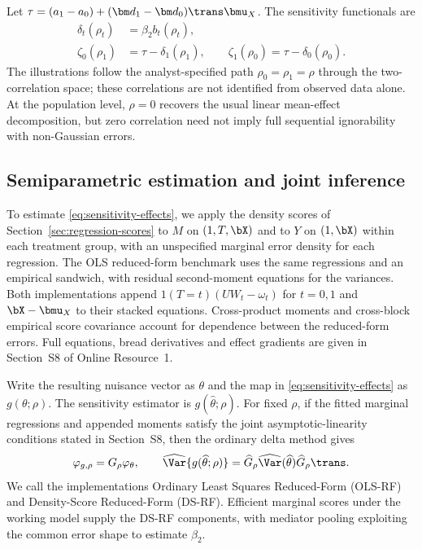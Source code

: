 Let $\tau=(a_1-a_0)+(\bm d_1-\bm d_0)\trans\bmu_X$. The sensitivity functionals are
\begin{align}
\delta_t(\rho_t)&=\beta_2 b_t(\rho_t),\nonumber\\
\zeta_0(\rho_1)&=\tau-\delta_1(\rho_1),\qquad
\zeta_1(\rho_0)=\tau-\delta_0(\rho_0).
\label{eq:sensitivity-effects}
\end{align}
The illustrations follow the analyst-specified path $\rho_0=\rho_1=\rho$ through the two-correlation space; these correlations are not identified from observed data alone. At the population level, $\rho=0$ recovers the usual linear mean-effect decomposition, but zero correlation need not imply full sequential ignorability with non-Gaussian errors.

\subsection{Semiparametric estimation and joint inference}

To estimate \eqref{eq:sensitivity-effects}, we apply the density scores of Section~\ref{sec:regression-scores} to $M$ on $(1,T,\bX)$ and to $Y$ on $(1,\bX)$ within each treatment group, with an unspecified marginal error density for each regression. The OLS reduced-form benchmark uses the same regressions and an empirical sandwich, with residual second-moment equations for the variances. Both implementations append $1(T=t)(UW_t-\omega_t)$ for $t=0,1$ and $\bX-\bmu_X$ to their stacked equations. Cross-product moments and cross-block empirical score covariance account for dependence between the reduced-form errors. Full equations, bread derivatives and effect gradients are given in Section~S8 of Online Resource~1.

Write the resulting nuisance vector as $\theta$ and the map in \eqref{eq:sensitivity-effects} as $g(\theta;\rho)$. The sensitivity estimator is $g(\widehat\theta;\rho)$. For fixed $\rho$, if the fitted marginal regressions and appended moments satisfy the joint asymptotic-linearity conditions stated in Section~S8, then the ordinary delta method gives
\[
\varphi_{g,\rho}=G_\rho\varphi_\theta,
\qquad
\widehat\Var\{g(\widehat\theta;\rho)\}
=\widehat G_\rho\widehat\Var(\widehat\theta)\widehat G_\rho\trans.
\]
We call the implementations Ordinary Least Squares Reduced-Form (OLS-RF) and Density-Score Reduced-Form (DS-RF). Efficient marginal scores under the working model supply the DS-RF components, with mediator pooling exploiting the common error shape to estimate $\beta_2$.


